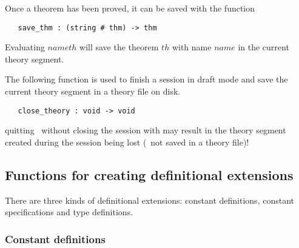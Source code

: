 {Once a theorem has been proved, it can be saved with the function

\begin{boxed}
\begin{verbatim}
   save_thm : (string # thm) -> thm
\end{verbatim}\end{boxed}

\noindent
Evaluating $name$$th$\ml{)} will save the theorem
$th$ with name $name$ in the current theory segment.

The following function is used to finish a session in  draft mode  and save the
current theory segment in a theory file on disk.

\begin{boxed}
\begin{verbatim}
   close_theory : void -> void
\end{verbatim}\end{boxed}

 quitting \HOL\ without closing the session with
 may result in the theory segment created during the session
being lost (\ie\ not saved in a theory file)!

\subsection{Functions for creating definitional extensions}
\label{avra_definitional}

There are three kinds of definitional extensions:
constant definitions, constant specifications and type definitions.

\subsubsection{Constant definitions}

}
